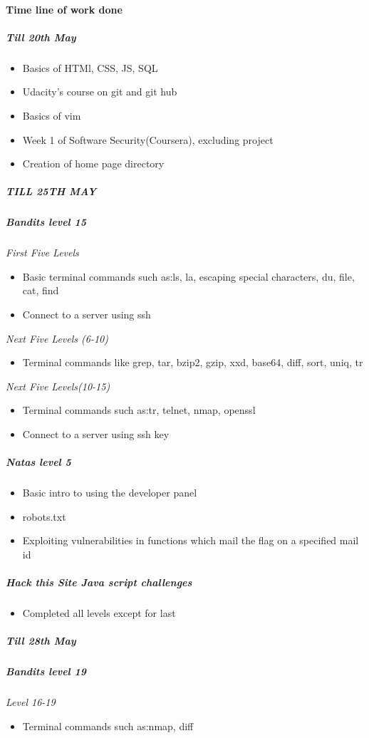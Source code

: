 \documentclass{article}
\begin{document}
\begin{itemize}
\paragraph{Time line of work done}
\subparagraph{\textit{Till 20th May}}
    \begin{itemize}
    \item Basics of HTMl, CSS, JS, SQL 
    \item Udacity's course on git and git hub 
    \item Basics of vim 
    \item Week 1 of Software Security(Coursera), excluding project 
    \item Creation of home page directory
    \end{itemize}
\subparagraph{\textit{TILL 25TH MAY}}
\subparagraph{Bandits level 15}
    \textit{First Five Levels}
    \begin{itemize}
    \item Basic terminal commands such as:ls, la, escaping special characters, du, file, cat, find
    \item Connect to a server using ssh
    \end{itemize}
    \textit{Next Five Levels (6-10)}
    \begin{itemize}
    \item Terminal commands like grep, tar, bzip2, gzip, xxd, base64, diff, sort, uniq, tr
    \end{itemize}
    \textit{Next Five Levels(10-15)}
    \begin{itemize}
    \item Terminal commands such as:tr, telnet, nmap, openssl
    \item Connect to a server using ssh key
    \end{itemize}
\subparagraph{Natas level 5}
    \begin{itemize}
    \item Basic intro to using the developer panel
    \item robots.txt
    \item Exploiting vulnerabilities in functions which mail the flag on a specified mail id
    \end{itemize}    
\subparagraph{Hack this Site Java script challenges}
    \begin{itemize}
    \item Completed all levels except for last
    \end{itemize}    
    
\subparagraph{\textit{Till 28th May}}
\subparagraph{Bandits level 19}
    \textit{Level 16-19}
    \begin{itemize}
    \item Terminal commands such as:nmap, diff
    \end{itemize}
    

\end{itemize}
\end{document}
